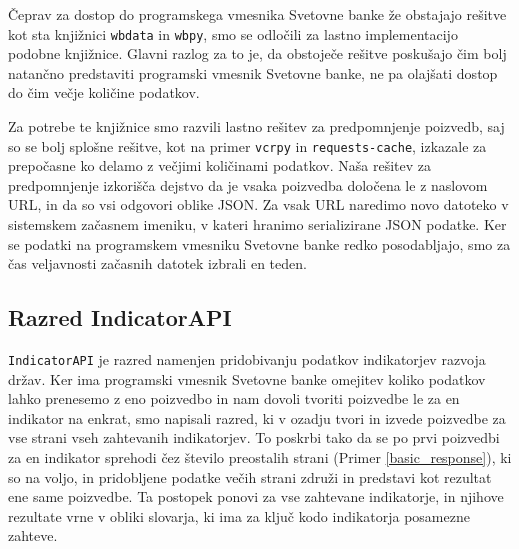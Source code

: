 Čeprav za dostop do programskega vmesnika Svetovne banke že obstajajo 
rešitve kot sta knjižnici 
\verb|wbdata| in
\verb|wbpy|, smo se odločili
za lastno implementacijo podobne knjižnice. Glavni razlog za to je, da
obstoječe rešitve poskušajo čim bolj natančno predstaviti programski
vmesnik Svetovne banke, ne pa olajšati dostop do čim večje količine
podatkov.

Za potrebe te knjižnice smo razvili lastno rešitev za predpomnjenje poizvedb,
saj so se bolj splošne rešitve, kot na primer
\verb|vcrpy| in
\verb|requests-cache|, 
izkazale za prepočasne ko delamo z večjimi količinami podatkov. Naša
rešitev za predpomnjenje izkorišča dejstvo da je vsaka poizvedba določena le
z naslovom URL, in da so vsi odgovori oblike JSON. Za vsak URL naredimo novo
datoteko v sistemskem začasnem imeniku, v kateri hranimo serializirane JSON
podatke. Ker se podatki na programskem vmesniku Svetovne banke redko
posodabljajo, smo za čas veljavnosti začasnih datotek izbrali en teden.






\subsection{Razred IndicatorAPI}

\verb|IndicatorAPI| je razred namenjen pridobivanju podatkov indikatorjev
razvoja držav. Ker ima programski vmesnik Svetovne banke omejitev koliko 
podatkov lahko prenesemo z eno poizvedbo in nam dovoli tvoriti poizvedbe le za
en indikator na enkrat, smo napisali razred, ki v ozadju tvori in izvede
poizvedbe za vse strani vseh zahtevanih indikatorjev. To poskrbi tako da se po
prvi poizvedbi za en indikator sprehodi čez število preostalih strani 
(Primer \ref{basic_response}), ki so na voljo, in pridobljene podatke večih
strani združi in predstavi kot rezultat ene same poizvedbe. Ta postopek ponovi
za vse zahtevane indikatorje, in njihove rezultate vrne v obliki slovarja, ki 
ima za ključ kodo indikatorja posamezne zahteve.

